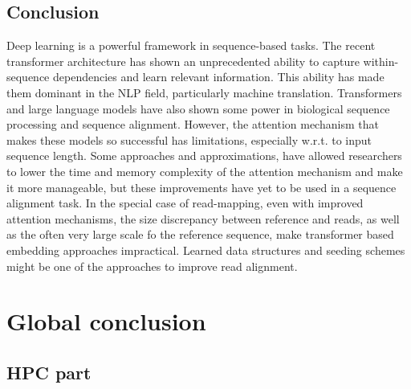 \documentclass[
  11pt,
  twoside,
  BCOR=10mm,
  listof=totoc]{scrbook}
\begin{document}
\hypertarget{conclusion-4}{%
\section{Conclusion}\label{conclusion-4}}

Deep learning is a powerful framework in sequence-based tasks. The recent transformer architecture has shown an unprecedented ability to capture within-sequence dependencies and learn relevant information. This ability has made them dominant in the NLP field, particularly machine translation. Transformers and large language models have also shown some power in biological sequence processing and sequence alignment. However, the attention mechanism that makes these models so successful has limitations, especially w.r.t. to input sequence length. Some approaches and approximations, have allowed researchers to lower the time and memory complexity of the attention mechanism and make it more manageable, but these improvements have yet to be used in a sequence alignment task. In the special case of read-mapping, even with improved attention mechanisms, the size discrepancy between reference and reads, as well as the often very large scale fo the reference sequence, make transformer based embedding approaches impractical. Learned data structures and seeding schemes might be one of the approaches to improve read alignment.

\printbibliography[segment=\therefsegment,heading=subbibintoc,title={References for chapter \thechapter}]

\hypertarget{global-conclusion}{%
\chapter*{Global conclusion}\label{global-conclusion}}

\hypertarget{hpc-part}{%
\section*{HPC part}\label{hpc-part}}
\end{document}
